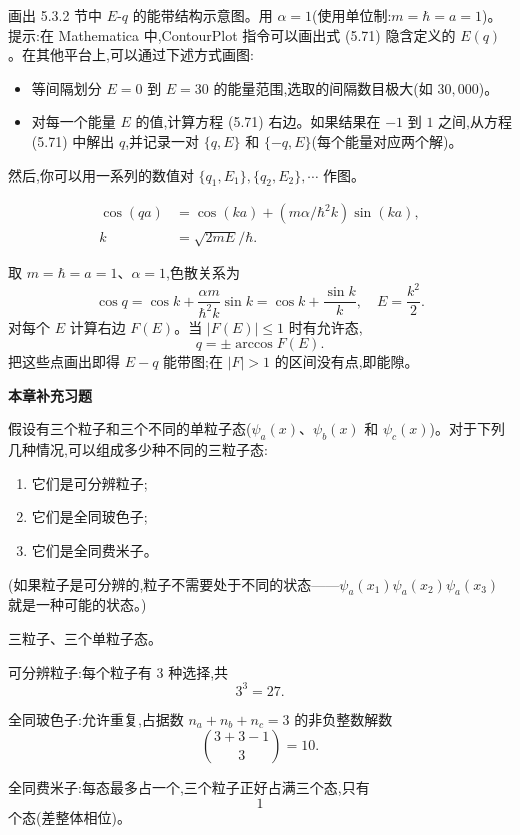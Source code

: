 \begin{question}
画出 5.3.2 节中 $E$-$q$ 的能带结构示意图。用 $\alpha=1$(使用单位制:$m=\hbar=a=1$)。提示:在 Mathematica 中,ContourPlot 指令可以画出式 (5.71) 隐含定义的 $E(q)$。在其他平台上,可以通过下述方式画图:
\begin{itemize}
\item 等间隔划分 $E=0$ 到 $E=30$ 的能量范围,选取的间隔数目极大(如 $30{,}000$)。
\item 对每一个能量 $E$ 的值,计算方程 (5.71) 右边。如果结果在 $-1$ 到 $1$ 之间,从方程 (5.71) 中解出 $q$,并记录一对 $\{q,E\}$ 和 $\{-q,E\}$(每个能量对应两个解)。
\end{itemize}
然后,你可以用一系列的数值对 $\{q_1,E_1\},\{q_2,E_2\},\cdots$ 作图。

\par\smallskip
{}\[\begin{aligned}\cos(qa)&=\cos(ka)+(m\alpha/\hbar^2k)\sin(ka),\\k&=\sqrt{2mE}/\hbar.\end{aligned}\]

\begin{solution}

取 $m=\hbar=a=1$、$\alpha=1$,色散关系为
\[
\cos q=\cos k+\frac{\alpha m}{\hbar^2 k}\sin k
=\cos k+\frac{\sin k}{k},
\quad E=\frac{k^2}{2}.
\]
对每个 $E$ 计算右边 $F(E)$。当 $|F(E)|\le1$ 时有允许态,
\[
q=\pm\arccos F(E).
\]
把这些点画出即得 $E-q$ 能带图;在 $|F|>1$ 的区间没有点,即能隙。

\end{solution}
\end{question}

\begin{center}\Large\bfseries 本章补充习题\end{center}

\begin{question}
假设有三个粒子和三个不同的单粒子态($\psi_a(x)$、$\psi_b(x)$ 和 $\psi_c(x)$)。对于下列几种情况,可以组成多少种不同的三粒子态:
\begin{enumerate}
\item 它们是可分辨粒子;
\item 它们是全同玻色子;
\item 它们是全同费米子。
\end{enumerate}
(如果粒子是可分辨的,粒子不需要处于不同的状态——$\psi_a(x_1)\psi_a(x_2)\psi_a(x_3)$ 就是一种可能的状态。)
\begin{solution}

三粒子、三个单粒子态。

可分辨粒子:每个粒子有 3 种选择,共
\[
3^3=27.
\]

全同玻色子:允许重复,占据数 $n_a+n_b+n_c=3$ 的非负整数解数
\[
\binom{3+3-1}{3}=10.
\]

全同费米子:每态最多占一个,三个粒子正好占满三个态,只有
\[
1
\]
个态(差整体相位)。

\end{solution}
\end{question}


